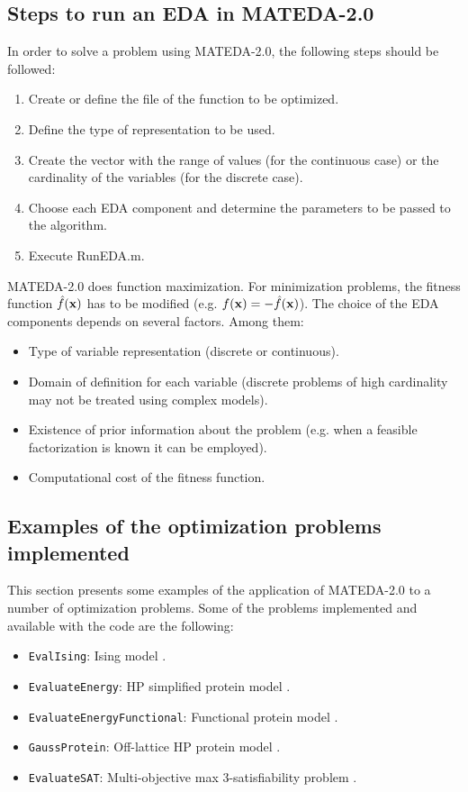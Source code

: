 \documentclass[a4paper]{article}
\begin{document}
\subsection{Steps to run an EDA in MATEDA-2.0}

In order to solve a problem using MATEDA-2.0, the following steps
should be followed:

\begin{enumerate}
  \item Create or define the file of the function to be optimized.
  \item Define the type of representation to be used.
  \item Create the vector with the range of values (for the continuous case)
  or the cardinality of the variables (for the discrete case).
  \item Choose each EDA component and determine the
  parameters to be passed to the algorithm.
  \item Execute RunEDA.m.
\end{enumerate}


 MATEDA-2.0 does function maximization. For minimization problems, the fitness function $\hat{f}({\bf{x}})$ has to be modified (e.g. $f({\bf{x}}) = -\hat{f}({\bf{x}})$).
The choice of the EDA components depends on several factors. Among them:
\begin{itemize}
 \item Type of variable representation (discrete or continuous).
 \item Domain
of definition for each variable (discrete problems of high
cardinality may not be treated using complex models).
 \item Existence
of prior information about the problem (e.g. when a feasible
factorization is known it can be employed).
 \item Computational cost of the fitness function.
 \end{itemize}


\subsection{Examples of the optimization problems implemented}


This section presents some examples of the application of MATEDA-2.0
to a number of optimization problems. Some of the problems
implemented and available with the code are the following:

\begin{itemize}
  \item \texttt{EvalIsing}: Ising model \cite{Ising:1925}.
  \item \texttt{EvaluateEnergy}: HP simplified protein model \cite{Dill:1985}.
  \item \texttt{EvaluateEnergyFunctional}: Functional protein model \cite{Hirst:1999}.
  \item \texttt{GaussProtein}: Off-lattice HP protein model \cite{Stillinger_et_al:1993}.
  \item \texttt{EvaluateSAT}: Multi-objective max 3-satisfiability problem \cite{Selman_et_al:1992}.
 \end{itemize}
\end{document}
